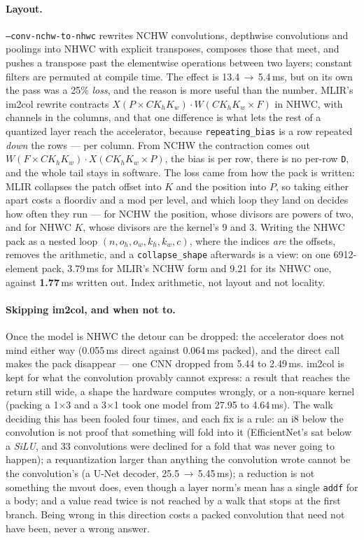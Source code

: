 \documentclass[runningheads]{llncs}
\begin{document}
\paragraph{Layout.} \texttt{--conv-nchw-to-nhwc} rewrites NCHW convolutions,
depthwise convolutions and poolings into NHWC with explicit transposes, composes
those that meet, and pushes a transpose past the elementwise operations between two
layers; constant filters are permuted at compile time. The effect is
13.4\,$\to$\,5.4\,ms, but on its own the pass was a 25\% \emph{loss}, and the
reason is more useful than the number. MLIR's im2col rewrite contracts
$X(P \times CK_hK_w)\cdot W(CK_hK_w \times F)$ in NHWC, with channels in the
columns, and that one difference is what lets the rest of a quantized layer reach
the accelerator, because \texttt{repeating\_bias} is a row repeated \emph{down} the
rows --- per column. From NCHW the contraction comes out $W(F \times CK_hK_w)\cdot X(CK_hK_w \times
P)$, the bias is per row, there is no per-row \texttt{D}, and the whole tail
stays in software. The loss came from how the pack is written: MLIR collapses
the patch offset into $K$ and the position into $P$, so taking either apart
costs a floordiv and a mod per level, and which loop they land on decides how
often they run --- for NCHW the position, whose divisors are powers of two, and
for NHWC $K$, whose divisors are the kernel's 9 and 3. Writing the NHWC pack as a
nested loop $(n, o_h, o_w, k_h, k_w, c)$, where the indices \emph{are} the
offsets, removes the arithmetic, and a \texttt{collapse\_shape} afterwards is a
view: on one 6912-element pack, 3.79\,ms for MLIR's NCHW form and 9.21 for its
NHWC one, against \textbf{1.77}\,ms written out. Index arithmetic, not layout and
not locality.

\paragraph{Skipping im2col, and when not to.} Once the model is NHWC the detour can be dropped: the accelerator does not mind
either way (0.055\,ms direct against 0.064\,ms packed), and the direct call makes
the pack disappear --- one CNN dropped from 5.44 to 2.49\,ms. im2col is kept for
what the convolution provably cannot express: a result that reaches the return
still wide, a shape the hardware computes wrongly, or a non-square kernel (packing
a 1$\times$3 and a 3$\times$1 took one model from 27.95 to 4.64\,ms). The walk deciding this has been fooled four times, and each fix is a rule: an i8
below the convolution is not proof that something will fold into it
(EfficientNet's sat below a \emph{SiLU}, and 33 convolutions were declined for a
fold that was never going to happen); a requantization larger than anything the
convolution wrote cannot be the convolution's (a U-Net decoder,
25.5\,$\to$\,5.45\,ms); a reduction is not something the mvout does, even though
a layer norm's mean has a single \texttt{addf} for a body; and a value read
twice is not reached by a walk that stops at the first branch. Being wrong in
this direction costs a packed convolution that need not have been, never a wrong
answer.
\end{document}
